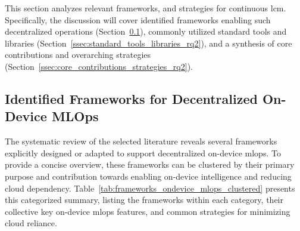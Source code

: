 This section analyzes relevant frameworks, and strategies for continuous \gls{lcm}. Specifically, the discussion will cover identified frameworks enabling such decentralized operations (Section~\ref{ssec:identified_frameworks_rq2}), commonly utilized standard tools and libraries (Section~\ref{ssec:standard_tools_libraries_rq2}), and a synthesis of core contributions and overarching strategies (Section~\ref{ssec:core_contributions_strategies_rq2}).

\subsection{Identified Frameworks for Decentralized On-Device MLOps}
\label{ssec:identified_frameworks_rq2}

The systematic review of the selected literature reveals several frameworks explicitly designed or adapted to support decentralized on-device \gls{mlops}. To provide a concise overview, these frameworks can be clustered by their primary purpose and contribution towards enabling on-device intelligence and reducing cloud dependency. Table~\ref{tab:frameworks_ondevice_mlops_clustered} presents this categorized summary, listing the frameworks within each category, their collective key on-device \gls{mlops} features, and common strategies for minimizing cloud reliance.

